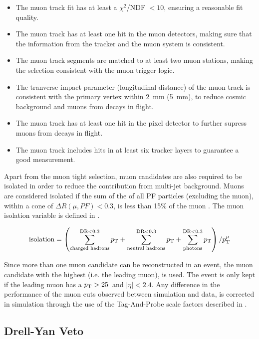\begin{itemize}
\item The muon track fit has at least a $\chi^{2}$/NDF $< 10$, ensuring a reasonable fit quality.
\item The muon track has at least one hit in the muon detectors, making sure that the information from the tracker and the muon system is consistent.
\item The muon track segments are matched to at least two muon stations, making the selection consistent with the muon trigger logic.
\item The tranverse impact parameter (longitudinal distance) of the muon track is consistent with the primary vertex within 2~mm (5~mm), to reduce cosmic background and muons from decays in flight. 
\item The muon track has at least one hit in the pixel detector to further supress muons from decays in flight.
\item The muon track includes hits in at least six tracker layers to guarantee a good \pt measurement.
\end{itemize}

Apart from the muon tight selection, muon candidates are also required to be isolated in order to reduce the contribution from multi-jet background. Muons are considered isolated if the sum of the \pt of all PF particles (excluding the muon), within a cone of $\Delta{R}\left(\mu, PF\right) < 0.3$, is less than 15$\%$ of the muon \pt. The muon isolation variable is defined in .

\begin{equation}
 \text{isolation} = \left(\sum_{\text{charged hadrons}}^{\text{DR}<0.3} p_{\mathrm{T}} + \sum_{\text{neutral hadrons}}^{\text{DR}<0.3} p_{\mathrm{T}} + \sum_{\text{photons}}^{\text{DR}<0.3} p_{\mathrm{T}}\right) / p_{\mathrm{T}}^\mu
 \label{eq:MuonIsolation}
\end{equation}

Since more than one muon candidate can be reconstructed in an event, the muon candidate with the highest \pt (i.e. the leading muon), is used. The event is only kept if the leading muon has a $p_{\mathrm{T}} > 25$~\GeVc and $|\eta| < 2.4$. Any difference in the performance of the muon cuts observed between simulation and data, is corrected in simulation through the use of the Tag-And-Probe scale factors described in .


\subsection{Drell-Yan Veto} \label{sec:WBoson_Selection_DrellYanVeto}


